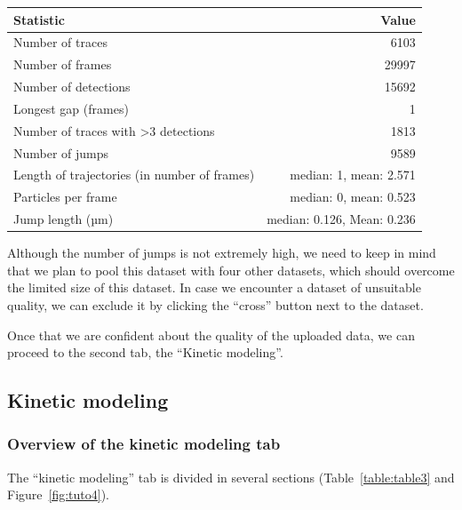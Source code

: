 \begin{center}
  \label{table:table2}
  \begin{tabular}{lr}
    Statistic & Value\\
    \hline
    Number of traces & 6103\\
    Number of frames & 29997\\
    Number of detections & 15692\\
    Longest gap (frames) & 1\\
    Number of traces with >3 detections & 1813\\
    Number of jumps & 9589\\
    Length of trajectories (in number of frames) & median: 1, mean: 2.571\\
    Particles per frame & median: 0, mean: 0.523\\
    Jump length (µm) & median: 0.126, Mean: 0.236\\
  \end{tabular}
\end{center}

Although the number of jumps is not extremely high, we need to keep in mind that we plan to pool this dataset with four other datasets, which should overcome the limited size of this dataset. In case we encounter a dataset of unsuitable quality, we can exclude it by clicking the ``cross'' button next to the dataset.

Once that we are confident about the quality of the uploaded data, we can proceed to the second tab, the ``Kinetic modeling''.

\subsection{Kinetic modeling}
\subsubsection{Overview of the kinetic modeling tab}
The ``kinetic modeling'' tab is divided in several sections (Table~\ref{table:table3} and Figure~\ref{fig:tuto4}).

